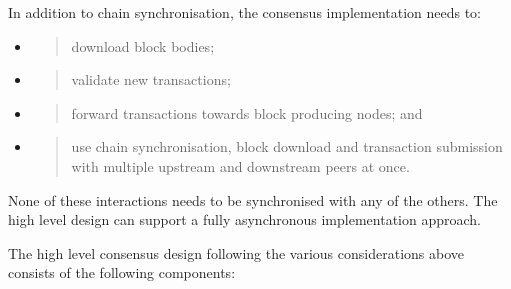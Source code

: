 \documentclass[]{article}
\begin{document}
In addition to chain synchronisation, the consensus implementation needs
to:

\begin{itemize}
\item
  \begin{quote}
  download block bodies;
  \end{quote}
\item
  \begin{quote}
  validate new transactions;
  \end{quote}
\item
  \begin{quote}
  forward transactions towards block producing nodes; and
  \end{quote}
\item
  \begin{quote}
  use chain synchronisation, block download and transaction submission
  with multiple upstream and downstream peers at once.
  \end{quote}
\end{itemize}

None of these interactions needs to be synchronised with any of the
others. The high level design can support a fully asynchronous
implementation approach.

The high level consensus design following the various considerations
above consists of the following components:
\end{document}
